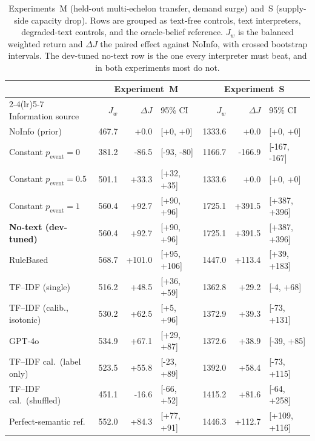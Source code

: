 \begin{table}[t]
\caption{Experiments~M (held-out multi-echelon transfer, demand surge) and~S
(supply-side capacity drop). Rows are grouped as text-free controls, text
interpreters, degraded-text controls, and the oracle-belief reference. $J_w$ is
the balanced weighted return and $\Delta J$ the paired effect against NoInfo,
with crossed bootstrap intervals. The dev-tuned no-text row is the one every
interpreter must beat, and in both experiments most do not.}
\label{tab:transfers}
\centering\footnotesize\setlength{\tabcolsep}{2.5pt}
\begin{tabular}{@{}l rrl rrl@{}}
\toprule
 & \multicolumn{3}{c}{Experiment~M} & \multicolumn{3}{c}{Experiment~S} \\
\cmidrule(lr){2-4}\cmidrule(lr){5-7}
Information source & $J_w$ & $\Delta J$ & 95\% CI & $J_w$ & $\Delta J$ & 95\% CI \\
\midrule
NoInfo (prior) & 467.7 & +0.0 & [+0, +0] & 1333.6 & +0.0 & [+0, +0] \\
Constant $p_{\mathrm{event}}=0$ & 381.2 & -86.5 & [-93, -80] & 1166.7 & -166.9 & [-167, -167] \\
Constant $p_{\mathrm{event}}=0.5$ & 501.1 & +33.3 & [+32, +35] & 1333.6 & +0.0 & [+0, +0] \\
Constant $p_{\mathrm{event}}=1$ & 560.4 & +92.7 & [+90, +96] & 1725.1 & +391.5 & [+387, +396] \\
\textbf{No-text (dev-tuned)} & 560.4 & +92.7 & [+90, +96] & 1725.1 & +391.5 & [+387, +396] \\
\midrule
RuleBased & 568.7 & +101.0 & [+95, +106] & 1447.0 & +113.4 & [+39, +183] \\
TF--IDF (single) & 516.2 & +48.5 & [+36, +59] & 1362.8 & +29.2 & [-4, +68] \\
TF--IDF (calib., isotonic) & 530.2 & +62.5 & [+5, +96] & 1372.9 & +39.3 & [-73, +131] \\
GPT-4o & 534.9 & +67.1 & [+29, +87] & 1372.6 & +38.9 & [-39, +85] \\
\midrule
TF--IDF cal.\ (label only) & 523.5 & +55.8 & [-23, +89] & 1392.0 & +58.4 & [-73, +115] \\
TF--IDF cal.\ (shuffled) & 451.1 & -16.6 & [-66, +52] & 1415.2 & +81.6 & [-64, +258] \\
Perfect-semantic ref. & 552.0 & +84.3 & [+77, +91] & 1446.3 & +112.7 & [+109, +116] \\
\bottomrule
\end{tabular}
\end{table}
